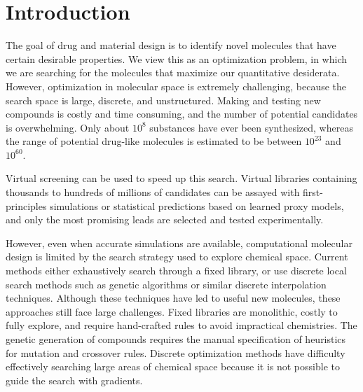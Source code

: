 \section{Introduction}

The goal of drug and material design is to identify novel molecules that have certain desirable properties.  We view this as an optimization problem, in which we are searching for the molecules that maximize our quantitative desiderata.
However, optimization in molecular space is extremely challenging, because the search space is large, discrete, and unstructured.
Making and testing new compounds is costly and time consuming, and the number of potential candidates is overwhelming. Only about $10^8$ substances have ever been synthesized, \cite{Kim2016} whereas the range of potential drug-like molecules is estimated to be between $10^{23}$ and $10^{60}$\cite{polischuk2013}.

Virtual screening can be used to speed up this search.\cite{shoichet_2004_virtual,scior2012,cheng2012,Pyzer_Knapp_2015} Virtual libraries containing thousands to hundreds of millions of candidates can be assayed with first-principles simulations or statistical predictions based on learned proxy models, and only the most promising leads are selected and tested experimentally.

However, even when accurate simulations are available,\cite{schneider_2010_virtual} computational molecular design is limited by the search strategy used to explore chemical space.
Current methods either exhaustively search through a fixed library,\cite{hachmann2011harvard,bombarelli2016} or use discrete local search methods such as genetic algorithms\cite{Virshup_2013, Rupakheti_2015, Reymond_2015, Reymond_2010,kanal_2013_efficient,oboyle_2011_computational} or similar discrete interpolation techniques.\cite{van_Deursen_2007,wang2006designing,balamurugan2008exploring}
Although these techniques have led to useful new molecules, these approaches still face large challenges. Fixed libraries are monolithic, costly to fully explore, and require hand-crafted rules to avoid impractical chemistries. The genetic generation of compounds requires the manual specification of heuristics for mutation and crossover rules. Discrete optimization methods have difficulty effectively searching large areas of chemical space because it is not possible to guide the search with gradients. 

